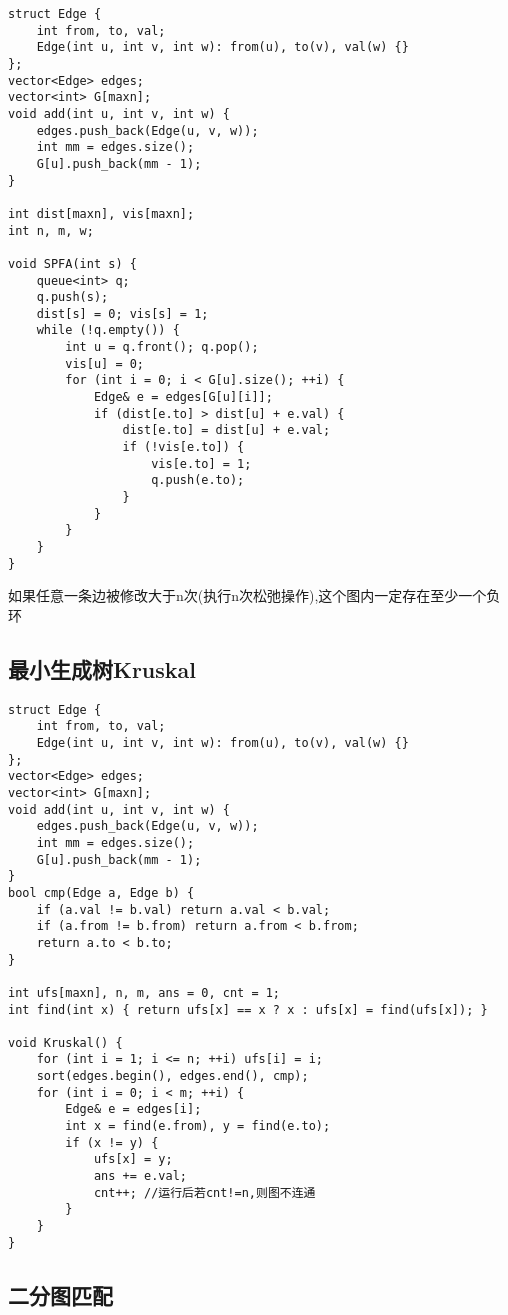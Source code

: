 \documentclass[UTF8]{ctexart}
\begin{document}
\begin{lstlisting}
struct Edge {
    int from, to, val;
    Edge(int u, int v, int w): from(u), to(v), val(w) {}
};
vector<Edge> edges;
vector<int> G[maxn];
void add(int u, int v, int w) {
    edges.push_back(Edge(u, v, w));
    int mm = edges.size();
    G[u].push_back(mm - 1);
}

int dist[maxn], vis[maxn];
int n, m, w;

void SPFA(int s) {
    queue<int> q;
    q.push(s);
    dist[s] = 0; vis[s] = 1;
    while (!q.empty()) {
        int u = q.front(); q.pop();
        vis[u] = 0;
        for (int i = 0; i < G[u].size(); ++i) {
            Edge& e = edges[G[u][i]];
            if (dist[e.to] > dist[u] + e.val) {
                dist[e.to] = dist[u] + e.val;
                if (!vis[e.to]) {
                    vis[e.to] = 1;
                    q.push(e.to);
                }
            }
        }
    }
}
\end{lstlisting}

如果任意一条边被修改大于n次(执行n次松弛操作),这个图内一定存在至少一个负环

\subsection{最小生成树Kruskal}

\begin{lstlisting}
struct Edge {
    int from, to, val;
    Edge(int u, int v, int w): from(u), to(v), val(w) {}
};
vector<Edge> edges;
vector<int> G[maxn];
void add(int u, int v, int w) {
    edges.push_back(Edge(u, v, w));
    int mm = edges.size();
    G[u].push_back(mm - 1);
}
bool cmp(Edge a, Edge b) {
    if (a.val != b.val) return a.val < b.val;
    if (a.from != b.from) return a.from < b.from;
    return a.to < b.to;
}

int ufs[maxn], n, m, ans = 0, cnt = 1;
int find(int x) { return ufs[x] == x ? x : ufs[x] = find(ufs[x]); }

void Kruskal() {
    for (int i = 1; i <= n; ++i) ufs[i] = i;
    sort(edges.begin(), edges.end(), cmp);
    for (int i = 0; i < m; ++i) {
        Edge& e = edges[i];
        int x = find(e.from), y = find(e.to);
        if (x != y) {
            ufs[x] = y;
            ans += e.val;
            cnt++; //运行后若cnt!=n,则图不连通
        }
    }
}
\end{lstlisting}

\subsection{二分图匹配}
\end{document}
